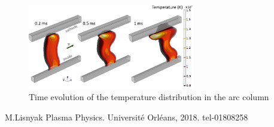 \begin{figure}[htbp]
	\centering
	\includegraphics[width=0.65\textwidth]{images/phd_simulT.png}
	\caption*{Time evolution of the temperature distribution in the arc column}
	\label{phd}
\end{figure}

\footnotesize{
\begin{thebibliography}{99}
      M.Lisnyak Plasma Physics. Université Orléans, 2018. tel-01808258
\end{thebibliography}}